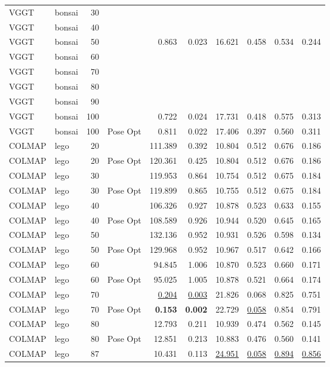 \begin{table}[H]
\begin{tabular}{llrlrrrrrr}
VGGT & bonsai & 30 &  &  &  &  &  &  &  \\
VGGT & bonsai & 40 &  &  &  &  &  &  &  \\
VGGT & bonsai & 50 &  & 0.863 & 0.023 & 16.621 & 0.458 & 0.534 & 0.244 \\
VGGT & bonsai & 60 &  &  &  &  &  &  &  \\
VGGT & bonsai & 70 &  &  &  &  &  &  &  \\
VGGT & bonsai & 80 &  &  &  &  &  &  &  \\
VGGT & bonsai & 90 &  &  &  &  &  &  &  \\
VGGT & bonsai & 100 &  & 0.722 & 0.024 & 17.731 & 0.418 & 0.575 & 0.313 \\
VGGT & bonsai & 100 & Pose Opt & 0.811 & 0.022 & 17.406 & 0.397 & 0.560 & 0.311 \\
\midrule
COLMAP & lego & 20 &  & 111.389 & 0.392 & 10.804 & 0.512 & 0.676 & 0.186 \\
COLMAP & lego & 20 & Pose Opt & 120.361 & 0.425 & 10.804 & 0.512 & 0.676 & 0.186 \\
COLMAP & lego & 30 &  & 119.953 & 0.864 & 10.754 & 0.512 & 0.675 & 0.184 \\
COLMAP & lego & 30 & Pose Opt & 119.899 & 0.865 & 10.755 & 0.512 & 0.675 & 0.184 \\
COLMAP & lego & 40 &  & 106.326 & 0.927 & 10.878 & 0.523 & 0.633 & 0.155 \\
COLMAP & lego & 40 & Pose Opt & 108.589 & 0.926 & 10.944 & 0.520 & 0.645 & 0.165 \\
COLMAP & lego & 50 &  & 132.136 & 0.952 & 10.931 & 0.526 & 0.598 & 0.134 \\
COLMAP & lego & 50 & Pose Opt & 129.968 & 0.952 & 10.967 & 0.517 & 0.642 & 0.166 \\
COLMAP & lego & 60 &  & 94.845 & 1.006 & 10.870 & 0.523 & 0.660 & 0.171 \\
COLMAP & lego & 60 & Pose Opt & 95.025 & 1.005 & 10.878 & 0.521 & 0.664 & 0.174 \\
COLMAP & lego & 70 &  & \underline{0.204} & \underline{0.003} & 21.826 & 0.068 & 0.825 & 0.751 \\
COLMAP & lego & 70 & Pose Opt & \textbf{0.153} & \textbf{0.002} & 22.729 & \underline{0.058} & 0.854 & 0.791 \\
COLMAP & lego & 80 &  & 12.793 & 0.211 & 10.939 & 0.474 & 0.562 & 0.145 \\
COLMAP & lego & 80 & Pose Opt & 12.851 & 0.213 & 10.883 & 0.476 & 0.560 & 0.141 \\
COLMAP & lego & 87 &  & 10.431 & 0.113 & \underline{24.951} & \underline{0.058} & \underline{0.894} & \underline{0.856} \\

\end{tabular}
\end{table}
